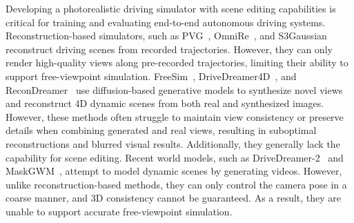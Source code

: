 Developing a photorealistic driving simulator with scene editing capabilities is critical for training and evaluating end-to-end autonomous driving systems. 
Reconstruction-based simulators, such as PVG~\cite{chen2023periodic}, OmniRe~\cite{chen2024omnire}, and S3Gaussian~\cite{huang2024s3gaussian} reconstruct driving scenes from recorded trajectories. 
However, they can only render high-quality views along pre-recorded trajectories, limiting their ability to support free-viewpoint simulation.
FreeSim~\cite{fan2024freesim}, DriveDreamer4D~\cite{zhao2024drive}, and ReconDreamer~\cite{Ni2024ReconDreamerCW} use diffusion-based generative models to synthesize novel views and reconstruct 4D dynamic scenes from both real and synthesized images.
However, these methods often struggle to maintain view consistency or preserve details when combining generated and real views, resulting in suboptimal reconstructions and blurred visual results. Additionally, they generally lack the capability for scene editing.
Recent world models, such as DriveDreamer-2~\cite{zhao2025drivedreamer} and MaskGWM~\cite{ni2025maskgwm}, attempt to model dynamic scenes by generating videos. 
However, unlike reconstruction-based methods, they can only control the camera pose in a coarse manner, and 3D consistency cannot be guaranteed. As a result, they are unable to support accurate free-viewpoint simulation.

